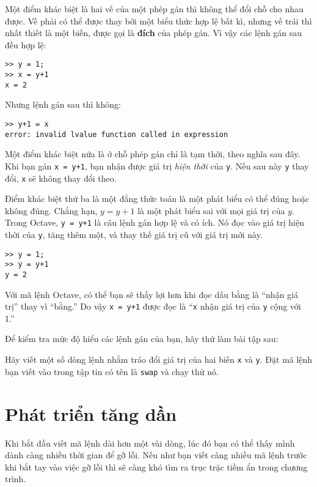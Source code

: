 \documentclass[12pt]{book}
\begin{document}
Một điểm khác biệt là hai vế của một phép gán thì không thể đổi chỗ
cho nhau được. Vế phải có thể được thay bởi một biểu thức hợp lệ
bất kì, nhưng vế trái thì nhất thiết là một biến, được gọi là 
{\bf đích} của phép gán. Vì vậy các lệnh gán sau đều hợp lệ:

\begin{verbatim}
>> y = 1;
>> x = y+1
x = 2
\end{verbatim}
%
Nhưng lệnh gán sau thì không:

\begin{verbatim}
>> y+1 = x
error: invalid lvalue function called in expression
\end{verbatim}
%
Một điểm khác biệt nữa là ở chỗ phép gán chỉ là tạm thời, theo nghĩa
sau đây. Khi bạn gán {\tt x = y+1}, bạn nhận được giá trị 
{\em hiện thời} của {\tt y}.  Nếu sau này {\tt y} thay đổi, {\tt x}
sẽ không thay đổi theo.

Điểm khác biệt thứ ba là một đẳng thức toán là một phát biểu có thể
đúng hoặc không đúng. Chẳng hạn, $y = y+1$ là một phát biểu
sai với mọi giá trị của $y$.  Trong Octave, {\tt y = y+1} là câu lệnh gán
hợp lệ và có ích. Nó đọc vào giá trị hiện thời của {\tt y}, tăng thêm một, 
và thay thế giá trị cũ với giá trị mới này.

\begin{verbatim}
>> y = 1;
>> y = y+1
y = 2
\end{verbatim}
%
Với mã lệnh Octave, có thể bạn sẽ thấy lợi hơn khi 
đọc dấu bằng là ``nhận giá trị'' thay vì ``bằng.''  Do vậy {\tt x = y+1}
được đọc là ``{\tt x} nhận giá trị của {\tt y} cộng với 1.''

Để kiểm tra mức độ hiểu các lệnh gán của bạn, hãy thử làm
bài tập sau:

\begin{ex}
Hãy viết một số dòng lệnh nhằm tráo đổi giá trị của hai biến
{\tt x} và {\tt y}. Đặt mã lệnh bạn viết vào trong tập tin có tên 
là {\tt swap} và chạy thử nó.
\end{ex}


\section{Phát triển tăng dần}

Khi bắt đầu viết mã lệnh dài hơn một vài dòng, lúc đó bạn
có thể thấy mình dành càng nhiều thời gian để gỡ lỗi. Nếu như
bạn viết càng nhiều mã lệnh trước khi bắt tay vào việc gỡ lỗi
thì sẽ càng khó tìm ra trục trặc tiềm ẩn trong chương trình.
\end{document}
